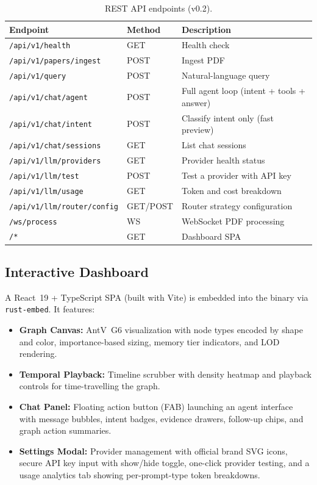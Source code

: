 \documentclass[11pt,twocolumn]{article}
\begin{document}
\begin{table}[h]
\centering\scriptsize
\begin{tabular}{@{}lll@{}}
\toprule
\textbf{Endpoint} & \textbf{Method} & \textbf{Description} \\
\midrule
\texttt{/api/v1/health} & GET & Health check \\
\texttt{/api/v1/papers/ingest} & POST & Ingest PDF \\
\texttt{/api/v1/query} & POST & Natural-language query \\
\texttt{/api/v1/chat/agent} & POST & Full agent loop (intent + tools + answer) \\
\texttt{/api/v1/chat/intent} & POST & Classify intent only (fast preview) \\
\texttt{/api/v1/chat/sessions} & GET & List chat sessions \\
\texttt{/api/v1/llm/providers} & GET & Provider health status \\
\texttt{/api/v1/llm/test} & POST & Test a provider with API key \\
\texttt{/api/v1/llm/usage} & GET & Token and cost breakdown \\
\texttt{/api/v1/llm/router/config} & GET/POST & Router strategy configuration \\
\texttt{/ws/process} & WS & WebSocket PDF processing \\
\texttt{/*} & GET & Dashboard SPA \\
\bottomrule
\end{tabular}
\caption{REST API endpoints (v0.2).}
\end{table}

\subsection{Interactive Dashboard}

A React~19 + TypeScript SPA (built with Vite) is embedded into the binary via \texttt{rust-embed}. It features:
\begin{itemize}[nosep]
  \item \textbf{Graph Canvas:} AntV~G6 visualization with node types encoded by shape and color, importance-based sizing, memory tier indicators, and LOD rendering.
  \item \textbf{Temporal Playback:} Timeline scrubber with density heatmap and playback controls for time-travelling the graph.
  \item \textbf{Chat Panel:} Floating action button (FAB) launching an agent interface with message bubbles, intent badges, evidence drawers, follow-up chips, and graph action summaries.
  \item \textbf{Settings Modal:} Provider management with official brand SVG icons, secure API key input with show/hide toggle, one-click provider testing, and a usage analytics tab showing per-prompt-type token breakdowns.
\end{itemize}
\end{document}
